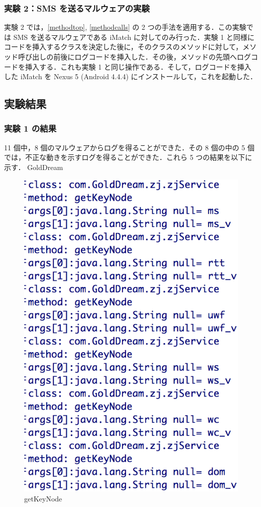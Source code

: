\subsubsection{実験 2：SMS  を送るマルウェアの実験}
\label{exp2}
実験 2 では，\ref{methodtop}, \ref{methodcalls} の 2 つの手法を適用する．この実験では SMS を送るマルウェアである iMatch に対してのみ行った．実験 1 と同様にコードを挿入するクラスを決定した後に，そのクラスのメソッドに対して，メソッド呼び出しの前後にログコードを挿入した．その後，メソッドの先頭へログコードを挿入する．これも実験 1 と同じ操作である．そして，ログコードを挿入した iMatch を Nexus 5 (Android 4.4.4) にインストールして，これを起動した．

\subsection{実験結果}
\subsubsection{実験 1 の結果}
11 個中，8 個のマルウェアからログを得ることができた．その 8 個の中の 5 個では，不正な動きを示すログを得ることができた．これら 5 つの結果を以下に示す．
GoldDream
\begin{figure}[t]
\begin{center}
\graphicspath{{./epsfiles/}}
\includegraphics[scale=0.25]{getkeynodezjservice.eps}
\end{center}
\caption{getKeyNode}
\label{zjservicegetkey}
\end{figure}

